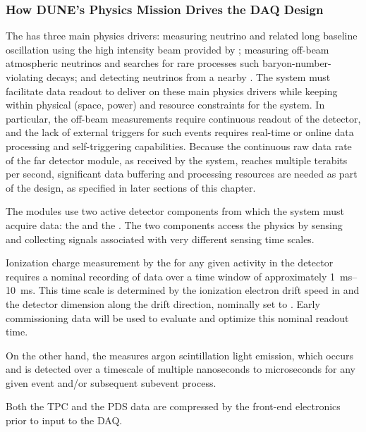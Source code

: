 \subsubsection{How DUNE's Physics Mission Drives the DAQ Design}

The   has three main physics drivers: measuring neutrino  and related
long baseline oscillation using the high intensity beam provided
by \fnal; measuring off-beam atmospheric neutrinos and searches
for rare processes such baryon-number-violating decays;
and detecting neutrinos from a nearby . The
   system must facilitate data
readout to deliver on these main physics drivers while keeping
within physical (space, power) and resource constraints for
the system. In particular, the off-beam measurements require continuous readout of the detector, 
and the lack of external triggers for such
events requires real-time or online data processing and
self-triggering capabilities. Because the
continuous raw data rate of the far detector module, as received by
the  system, reaches multiple
terabits per second, significant data buffering and processing
resources are needed as part of the design, as specified in
later sections of this chapter.

The   modules use two active detector components from which the 
 system must acquire data: the  and the . 
The two components access the physics by sensing and collecting signals associated with very different sensing time scales.

Ionization charge measurement by the  for any given activity in the detector 
requires a nominal recording of data over a time window of approximately \SIrange{1}{10}{\milli\second}. 
This time scale is determined by the ionization electron drift speed in  and the detector 
dimension along the drift direction, nominally set to 
\dpreadout.
Early commissioning data will be used to evaluate and optimize this nominal readout time.

On the other hand, the  measures argon scintillation light emission,
which occurs and is detected over a timescale of multiple nanoseconds to
microseconds for any given event and/or subsequent subevent process.

Both the TPC and the PDS data are compressed by the front-end electronics prior
to input to the DAQ.
 
